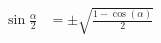 \begin{equation}
\begin{split}
    \sin \frac{\alpha}{2} &= \pm \sqrt{\frac{1 - \cos(\alpha)}{2}}
\end{split}
\end{equation}